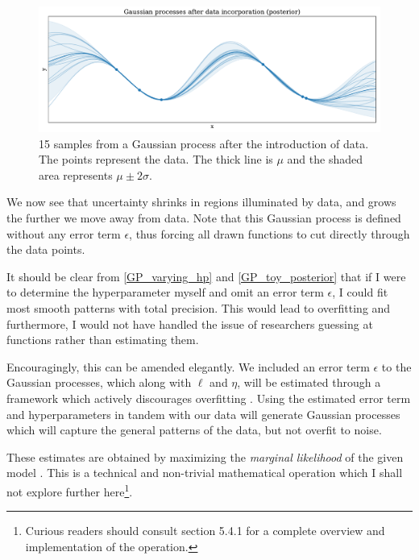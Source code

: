 \documentclass[a4paper]{article}
\begin{document}
\begin{figure}[!htb]
	\centering
	\includegraphics[scale=0.47]{GP_toy_posterior.pdf}
    \caption{\footnotesize{15 samples from a Gaussian process after the introduction of data. The points represent the data. The thick line is $\mu$ and the shaded area represents $\mu \pm 2\sigma$.}}\label{GP_toy_posterior}
\end{figure}

We now see that uncertainty shrinks in regions illuminated by data, and grows the further we move away from data. Note that this Gaussian process is defined without any error term $\epsilon$, thus forcing all drawn functions to cut directly through the data points.\par

It should be clear from \autoref{GP_varying_hp} and \autoref{GP_toy_posterior} that if I were to determine the hyperparameter myself and omit an error term $\epsilon$, I could fit most smooth patterns with total precision. This would lead to overfitting and furthermore, I would not have handled the issue of researchers guessing at functions rather than estimating them.\par

Encouragingly, this can be amended elegantly. We included an error term $\epsilon$ to the Gaussian processes, which along with $\ell$ and $\eta$, will be estimated through a framework which actively discourages overfitting \cite[114-115]{williams2006gaussian}. Using the estimated error term and hyperparameters in tandem with our data will generate Gaussian processes which will capture the general patterns of the data, but not overfit to noise.\par

These estimates are obtained by maximizing the \emph{marginal likelihood} of the given model \cite[114-115]{williams2006gaussian}. This is a technical and non-trivial mathematical operation which I shall not explore further here\footnote{Curious readers should consult \cite{williams2006gaussian} section 5.4.1 for a complete overview and implementation of the operation.}.\par
\end{document}
